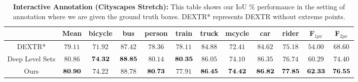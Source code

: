 \documentclass[10pt,twocolumn,letterpaper]{article}
\begin{document}
\begin{table*}[t!]
\centering
  \begin{tabular}{|c|c|cccccccc|cc|}
  \cline{2-12}
  \multicolumn{1}{c|}{}  & Mean & \multicolumn{1}{c}{bicycle} & \multicolumn{1}{c}{bus} & \multicolumn{1}{c}{person} & \multicolumn{1}{c}{train} & \multicolumn{1}{c}{truck} & \multicolumn{1}{c}{mcycle} & \multicolumn{1}{c}{car} & rider & \multicolumn{1}{c}{F$_{1px}$} & \multicolumn{1}{c|}{F$_{2px}$}  \\ 
  \hline 
  DEXTR* \cite{dextr} 
    &$79.11$ &$71.92$  &$87.42$ &$78.36$ &$78.11$ &$84.88$ &$72.41$ &$84.62$ &$75.18$ &$54.00$ &$68.60$ \\ 
  Deep Level Sets \cite{wang2019delse} 
    &$80.86$ &$\bf{74.32}$ &$\bf{88.85} $ &$80.14$ &$\bf{80.35}$ &$ 86.05$ &$ 74.10 $ &$86.35$ &$  76.74$ &$60.29$ &$74.40$ \\
  Ours 
    &$\bf{80.90}$ &$74.22$ &$88.78$ &$\bf{80.73}$ &$77.91$ &$\bf{86.45}$ &$\bf{74.42}$  &$\bf{86.82}$ &$\bf{77.85}$ &$\bf{62.33}$ &$\bf{76.55}$\\
  \hline 

  \end{tabular}
  \caption{\textbf{Interactive Annotation (Cityscapes Stretch):} This table shows our IoU \% performance in the setting of annotation where we are given the ground truth boxes. DEXTR* represents DEXTR without extreme points.}
  \label{tab:anno-results-stretch}
\end{table*}
\end{document}
